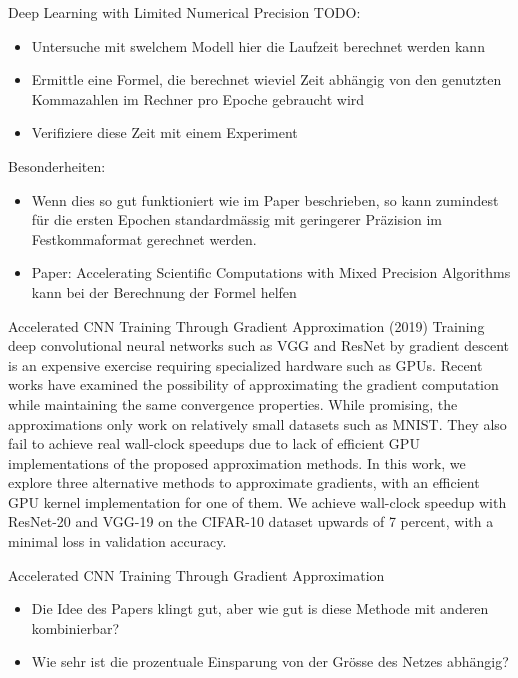 \documentclass[10pt]{beamer}
\begin{document}
\begin{frame}{Deep Learning with Limited Numerical Precision}
 TODO:
 \begin{itemize}
  \item Untersuche mit swelchem Modell hier die Laufzeit berechnet werden kann 
  \item Ermittle eine Formel, die berechnet wieviel Zeit abhängig von den genutzten Kommazahlen im Rechner pro Epoche gebraucht wird
  \item Verifiziere diese Zeit mit einem Experiment
 \end{itemize}
 Besonderheiten:
 \begin{itemize}
  \item Wenn dies so gut funktioniert wie im Paper beschrieben, so kann zumindest für die ersten Epochen standardmässig mit geringerer Präzision im Festkommaformat gerechnet werden.
  \item Paper: Accelerating Scientific Computations with Mixed
Precision Algorithms kann bei der Berechnung der Formel helfen
 \end{itemize}
\end{frame}


\begin{frame}{Accelerated CNN Training Through Gradient Approximation (2019) }
 Training deep convolutional neural networks such as VGG and ResNet by gradient descent is an expensive exercise requiring specialized hardware such as GPUs. Recent works have examined the possibility of approximating the gradient computation while maintaining the same convergence properties. While promising, the approximations only work on relatively small datasets such as MNIST. They also fail to achieve real wall-clock speedups due to lack of efficient GPU implementations of the proposed approximation methods. In this work, we explore three alternative methods to approximate gradients, with an efficient GPU kernel implementation for one of them. We achieve wall-clock speedup with ResNet-20 and VGG-19 on the CIFAR-10 dataset upwards of 7 percent, with a minimal loss in validation accuracy.
\end{frame}

\begin{frame}{Accelerated CNN Training Through Gradient Approximation}
\begin{itemize}
 \item Die Idee des Papers klingt gut, aber wie gut is diese Methode mit anderen kombinierbar?
 \item Wie sehr ist die prozentuale Einsparung von der Grösse des Netzes abhängig?
\end{itemize}
\end{frame}
\end{document}
